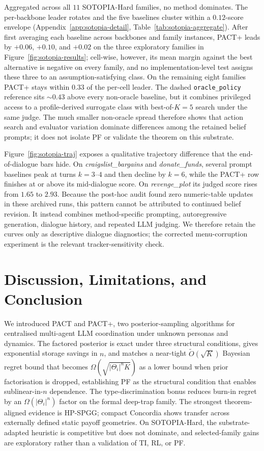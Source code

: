 \documentclass{article}
\def\textsuperscript#1{#1}%
\begin{document}
Aggregated across all $11$ SOTOPIA-Hard families, no method dominates. The per-backbone leader rotates and the five baselines cluster within a $0.12$-score envelope (Appendix~\ref{app:sotopia-detail}, Table~\ref{tab:sotopia-aggregate}). After first averaging each baseline across backbones and family instances, PACT\textsuperscript{+} leads by $+0.06$, $+0.10$, and $+0.02$ on the three exploratory families in Figure~\ref{fig:sotopia-results}; cell-wise, however, its mean margin against the best alternative is negative on every family, and no implementation-level test assigns these three to an assumption-satisfying class. On the remaining eight families PACT\textsuperscript{+} stays within $0.33$ of the per-cell leader. The dashed \texttt{oracle\_policy} reference sits $\sim 0.43$ above every non-oracle baseline, but it combines privileged access to a profile-derived surrogate class with best-of-$K{=}5$ search under the same judge. The much smaller non-oracle spread therefore shows that action search and evaluator variation dominate differences among the retained belief prompts; it does not isolate PF or validate the theorem on this substrate.

Figure~\ref{fig:sotopia-traj} exposes a qualitative trajectory difference that the end-of-dialogue bars hide. On \emph{craigslist\_bargains} and \emph{donate\_funds}, several prompt baselines peak at turns $k=3$--$4$ and then decline by $k=6$, while the PACT\textsuperscript{+} row finishes at or above its mid-dialogue score. On \emph{revenge\_plot} its judged score rises from $1.65$ to $2.93$. Because the post-hoc audit found zero numeric-table updates in these archived runs, this pattern cannot be attributed to continued belief revision. It instead combines method-specific prompting, autoregressive generation, dialogue history, and repeated LLM judging. We therefore retain the curves only as descriptive dialogue diagnostics; the corrected menu-corruption experiment is the relevant tracker-sensitivity check.

\section{Discussion, Limitations, and Conclusion}
\label{sec:discussion}

We introduced PACT and PACT\textsuperscript{+}, two posterior-sampling algorithms for centralised multi-agent LLM coordination under unknown personas and dynamics. The factored posterior is exact under three structural conditions, gives exponential storage savings in $n$, and matches a near-tight $\tilde O(\sqrt K)$ Bayesian regret bound that becomes $\Omega(\sqrt{|\Theta_i|^n K})$ as a lower bound when prior factorisation is dropped, establishing PF as the structural condition that enables sublinear-in-$n$ dependence. The type-discrimination bonus reduces burn-in regret by an $\Omega(|\Theta_i|^n)$ factor on the formal deep-trap family. The strongest theorem-aligned evidence is HP-SPGG; compact Concordia shows transfer across externally defined static payoff geometries. On SOTOPIA-Hard, the substrate-adapted heuristic is competitive but does not dominate, and selected-family gains are exploratory rather than a validation of TI, RL, or PF.
\end{document}
